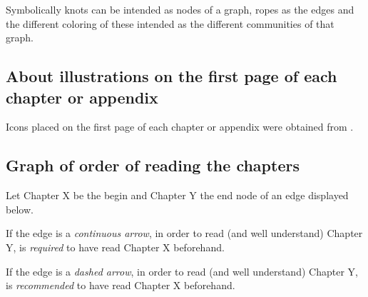 Symbolically knots can be intended as nodes of a graph, ropes as the edges and the different coloring of these intended as the different communities of that graph.

\subsection{About illustrations on the first page of each chapter or appendix}
\label{subsection:Preface/Aboutthisthesis/Aboutillustrationsonthefirstpageofeachchapterorappendix}
Icons placed on the first page of each chapter or appendix were obtained from . 

\subsection{Graph of order of reading the chapters} \label{subsection:Preface/Aboutthisthesis/Graphoforderofreadingthechapters}
	Let Chapter X be the begin and Chapter Y the end node of an edge displayed below.
	
\noindent If the edge is a \textit{continuous arrow}, in order to read (and well understand) Chapter Y, is \textit{required} to have read Chapter X beforehand.

\noindent If the edge is a \textit{dashed arrow}, in order to read (and well understand) Chapter Y, is \textit{recommended} to have read Chapter X beforehand.

